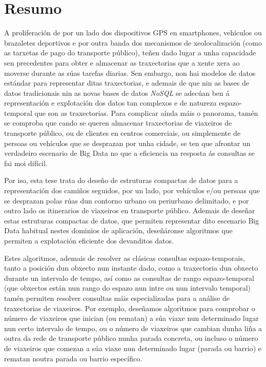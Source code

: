 \chapter*{Resumo}

A proliferaci\'on de por un lado dos dispositivos GPS en smartphones, veh\'iculos ou brazaletes deportivos e por outra banda dos mecanismos de xeolocalizaci\'on (como as tarxetas de pago do transporte p\'ublico), te\~nen dado lugar a unha capacidade sen precedentes para obter e almacenar as traxectorias que a xente xera ao moverse durante as s\'uas tarefas diarias. Sen embargo, non hai modelos de datos est\'andar para representar ditas traxectorias, e ademais de que nin as bases de datos tradicionais nin as novas bases de datos \textit{NoSQL} se adec\'uan ben \'a representaci\'on e explotaci\'on dos datos tan complexos e de natureza espazo-temporal que son as traxectorias. Para complicar a\'inda m\'ais o panorama, tam\'en se comproba que cando se queren almacenar traxectorias de viaxeiros de transporte p\'ublico, ou de clientes en centros comerciais, ou simplemente de persoas ou veh\'iculos que se desprazan por unha cidade, se ten que afrontar un verdadeiro escenario de Big Data no que a eficiencia na resposta \'as consultas se fai moi dif\'icil.

Por iso, esta tese trata do dese\~no de estruturas compactas de datos para a representaci\'on dos cami\~nos seguidos, por un lado, por veh\'iculos e/ou persoas que se desprazan polas r\'uas dun contorno urbano ou periurbano delimitado, e por outro lado os itinerarios de viaxeiros en transporte p\'ublico. Ademais de dese\~nar estas estruturas compactas de datos, que permiten representar dito escenario Big Data habitual nestes dominios de aplicaci\'on, dese\~n\'aronse algoritmos que permiten a explotaci\'on eficiente dos devanditos datos.

Estes algoritmos, ademais de resolver as cl\'asicas consultas espazo-temporais, tanto a posici\'on dun obxecto nun instante dado, como a traxectoria dun obxecto durante un intervalo de tempo, as\'i como as consultas de rango espazo-temporal (que obxectos est\'an nun rango do espazo nun intre ou nun intervalo temporal) tam\'en permiten resolver consultas m\'ais especializadas para a an\'alise de traxectorias de viaxeiros. Por exemplo, dese\~namos algoritmos para comprobar o n\'umero de viaxeiros que inician (ou rematan) a s\'ua viaxe nun determinado lugar nun certo intervalo de tempo, ou o n\'umero de viaxeiros que cambian dunha li\~na a outra da rede de transporte p\'ublico nunha parada concreta, ou incluso o n\'umero de viaxeiros que comezan a s\'ua viaxe nun determinado lugar (parada ou barrio) e rematan noutra parada ou barrio espec\'ifico.

